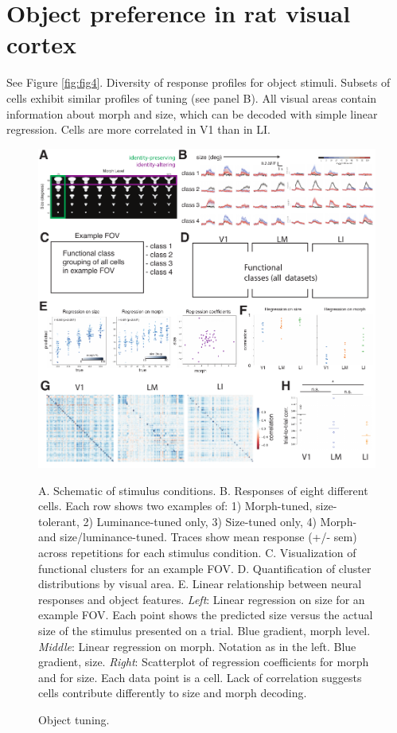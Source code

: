 \documentclass{article}
\begin{document}
\section{Object preference in rat visual cortex}
See Figure \ref{fig:fig4}. Diversity of response profiles for object stimuli. Subsets of cells exhibit similar profiles of tuning (see panel B). All visual areas contain information about morph and size, which can be decoded with simple linear regression. Cells are more correlated in V1 than in LI. 

\begin{figure}[ht]
  \includegraphics[width=\textwidth]{figures/objects.pdf}
  \caption{Object tuning.}
  \medskip
  \small
  A.  Schematic of stimulus conditions.
  B.  Responses of eight different cells.  Each row shows two examples of:  1)  Morph-tuned, size-tolerant, 2)  Luminance-tuned only, 3) Size-tuned only, 4)  Morph- and size/luminance-tuned. Traces show mean response (+/- sem) across repetitions for each stimulus condition.
  C.  Visualization of functional clusters for an example FOV.
  D.  Quantification of cluster distributions by visual area.
  E.  Linear relationship between neural responses and object features. \textit{Left}: Linear regression on size for an example FOV. Each point shows the predicted size versus the actual size of the stimulus presented on a trial. Blue gradient, morph level.  \textit{Middle}: Linear regression on morph. Notation as in the left. Blue gradient, size. \textit{Right}: Scatterplot of regression coefficients for morph and for size. Each data point is a cell. Lack of correlation suggests cells contribute differently to size and morph decoding.

\end{figure}
\end{document}
